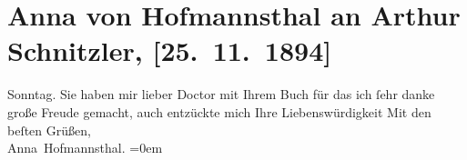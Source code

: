 

         
         \renewcommand{\erwaehntePersonen}{Personen: Hugo August von Hofmannsthal}
         \renewcommand{\erwaehnteOrte}{Orte: Wien}
         \renewcommand{\erwaehnteWerke}{Werke: Sterben. Novelle}
               \section[Anna von Hofmannsthal an Arthur Schnitzler, {[}25. 11. 1894{]}]{ Anna von Hofmannsthal an Arthur Schnitzler, {[}25. 11. 1894{]}}\nopagebreak{}\rehead{ }\begin{ledgroupsized}[t]{13cm}\normalsize\beginnumbering \toendnotes[C]{\smallbreak\pagebreak[2]} 
\toendnotes[C]{\smallbreak}\pstart
           \noindent{}{\pb}\textcolor{gray}{\textbf{\label{T_L00405-1v}\label{T_L00405-1h}}}\hfill Sonntag.\pend
           \pstart
           Sie haben mir lieber Doctor mit Ihrem Buch für das ich ſehr danke große Freude gemacht, auch
               entzückte mich Ihre Liebenswürdigkeit\pend
           \pstart
           Mit den beſten Grüßen,{\\[\baselineskip]}\spacefill\mbox{Anna Hofmannsthal.}\pend
           \leftskip=0em{}
         
         \endnumbering{}\end{ledgroupsized}  \newcommand{\dateiname}{L00405}\newcommand{\titel}{Anna von Hofmannsthal an Arthur Schnitzler, [25. 11. 1894]}\newcommand{\editorInnen}{Martin Anton Müller und Gerd-Hermann Susen}
      
